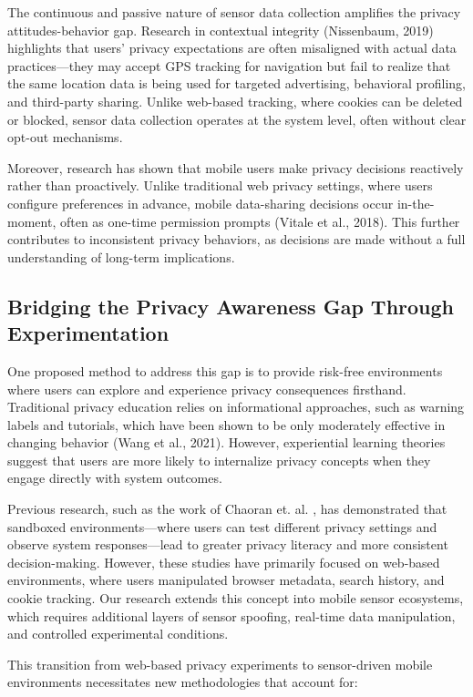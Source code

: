 \documentclass[acmlarge, nonacm]{acmart}
\begin{document}
The continuous and passive nature of sensor data collection amplifies the privacy attitudes-behavior gap. Research in contextual integrity (Nissenbaum, 2019) highlights that users’ privacy expectations are often misaligned with actual data practices—they may accept GPS tracking for navigation but fail to realize that the same location data is being used for targeted advertising, behavioral profiling, and third-party sharing. Unlike web-based tracking, where cookies can be deleted or blocked, sensor data collection operates at the system level, often without clear opt-out mechanisms.

Moreover, research has shown that mobile users make privacy decisions reactively rather than proactively. Unlike traditional web privacy settings, where users configure preferences in advance, mobile data-sharing decisions occur in-the-moment, often as one-time permission prompts (Vitale et al., 2018). This further contributes to inconsistent privacy behaviors, as decisions are made without a full understanding of long-term implications.

\subsection{Bridging the Privacy Awareness Gap Through Experimentation}
One proposed method to address this gap is to provide risk-free environments where users can explore and experience privacy consequences firsthand. Traditional privacy education relies on informational approaches, such as warning labels and tutorials, which have been shown to be only moderately effective in changing behavior (Wang et al., 2021). However, experiential learning theories suggest that users are more likely to internalize privacy concepts when they engage directly with system outcomes.

Previous research, such as the work of Chaoran et. al. \cite{Chaoran2023EmpathySandbox}, has demonstrated that sandboxed environments—where users can test different privacy settings and observe system responses—lead to greater privacy literacy and more consistent decision-making. However, these studies have primarily focused on web-based environments, where users manipulated browser metadata, search history, and cookie tracking. Our research extends this concept into mobile sensor ecosystems, which requires additional layers of sensor spoofing, real-time data manipulation, and controlled experimental conditions.

This transition from web-based privacy experiments to sensor-driven mobile environments necessitates new methodologies that account for:
\end{document}
